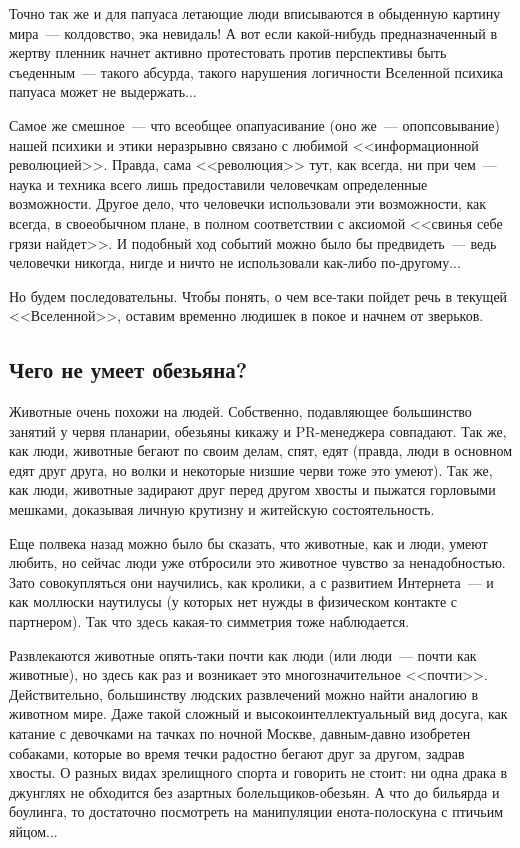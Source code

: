 \documentclass{scrbook}
\newcommand{\flqq}{<<}
\newcommand{\frqq}{>>}
\newcommand{\mdash}{~--- }
\newcommand{\essaysection}[1]{\subsection*{#1}\nopagebreak}
\begin{document}
Точно так же и для папуаса летающие люди вписываются в обыденную картину мира{\mdash}колдовство, эка невидаль! А вот если какой-нибудь предназначенный в жертву пленник начнет активно протестовать против перспективы быть съеденным{\mdash}такого абсурда, такого нарушения логичности Вселенной психика папуаса может не выдержать...

Самое же смешное{\mdash}что всеобщее опапуасивание (оно же{\mdash}опопсовывание) нашей психики и этики неразрывно связано с любимой {\flqq}информационной революцией{\frqq}. Правда, сама {\flqq}революция{\frqq} тут, как всегда, ни при чем{\mdash}наука и техника всего лишь предоставили человечкам определенные возможности. Другое дело, что человечки использовали эти возможности, как всегда, в своеобычном плане, в полном соответствии с аксиомой {\flqq}свинья себе грязи найдет{\frqq}. И подобный ход событий можно было бы предвидеть{\mdash}ведь человечки никогда, нигде и ничто не использовали как-либо по-другому...

Но будем последовательны. Чтобы понять, о чем все-таки пойдет речь в текущей {\flqq}Вселенной{\frqq}, оставим временно людишек в покое и начнем от зверьков.

\essaysection{Чего не умеет обезьяна?}

Животные очень похожи на людей. Собственно, подавляющее большинство занятий у червя планарии, обезьяны кикажу и PR-менеджера совпадают. Так же, как люди, животные бегают по своим делам, спят, едят (правда, люди в основном едят друг друга, но волки и некоторые низшие черви тоже это умеют). Так же, как люди, животные задирают друг перед другом хвосты и пыжатся горловыми мешками, доказывая личную крутизну и житейскую состоятельность.

Еще полвека назад можно было бы сказать, что животные, как и люди, умеют любить, но сейчас люди уже отбросили это животное чувство за ненадобностью. Зато совокупляться они научились, как кролики, а с развитием Интернета{\mdash}и как моллюски наутилусы (у которых нет нужды в физическом контакте с партнером). Так что здесь какая-то симметрия тоже наблюдается.

Развлекаются животные опять-таки почти как люди (или люди{\mdash}почти как животные), но здесь как раз и возникает это многозначительное {\flqq}почти{\frqq}. Действительно, большинству людских развлечений можно найти аналогию в животном мире. Даже такой сложный и высокоинтеллектуальный вид досуга, как катание с девочками на тачках по ночной Москве, давным-давно изобретен собаками, которые во время течки радостно бегают друг за другом, задрав хвосты. О разных видах зрелищного спорта и говорить не стоит: ни одна драка в джунглях не обходится без азартных болельщиков-обезьян. А что до бильярда и боулинга, то достаточно посмотреть на манипуляции енота-полоскуна с птичьим яйцом...
\end{document}
